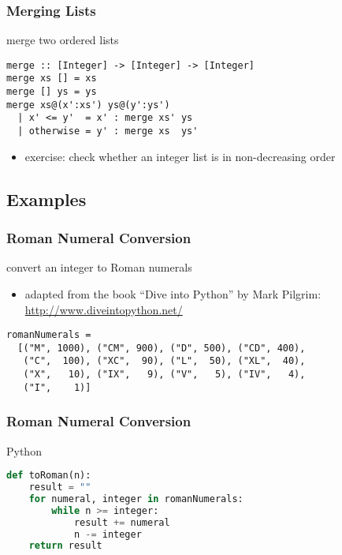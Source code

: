 \documentclass[dvipsnames]{beamer}
\theoremstyle{plain}
\begin{document}
\begin{frame}[fragile]
  \frametitle{Merging Lists}

  \begin{exampleblock}{merge two ordered lists}
    \begin{lstlisting}
merge :: [Integer] -> [Integer] -> [Integer]
merge xs [] = xs
merge [] ys = ys
merge xs@(x':xs') ys@(y':ys')
  | x' <= y'  = x' : merge xs' ys
  | otherwise = y' : merge xs  ys'
    \end{lstlisting}
  \end{exampleblock}

  \pause
  \begin{itemize}
    \item exercise: check whether an integer list is in non-decreasing order
  \end{itemize}
\end{frame}

\subsection{Examples}

\begin{frame}[fragile]
  \frametitle{Roman Numeral Conversion}

  \begin{exampleblock}{convert an integer to Roman numerals}
    \begin{itemize}
      \item adapted from the book ``Dive into Python'' by Mark Pilgrim:\\
        \url{http://www.diveintopython.net/}
    \end{itemize}

    \medskip
    \begin{lstlisting}
romanNumerals =
  [("M", 1000), ("CM", 900), ("D", 500), ("CD", 400),
   ("C",  100), ("XC",  90), ("L",  50), ("XL",  40),
   ("X",   10), ("IX",   9), ("V",   5), ("IV",   4),
   ("I",    1)]
    \end{lstlisting}
  \end{exampleblock}
\end{frame}

\begin{frame}[fragile]
  \frametitle{Roman Numeral Conversion}

  \begin{exampleblock}{Python}
    \begin{lstlisting}[language=Python]
def toRoman(n):
    result = ""
    for numeral, integer in romanNumerals:
        while n >= integer:
            result += numeral
            n -= integer
    return result
    \end{lstlisting}
  \end{exampleblock}
\end{frame}
\end{document}
